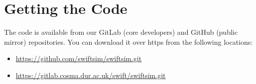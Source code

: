 \section{Getting the Code}

The code is available from our GitLab (core developers) and GitHub (public mirror)
repositories. You can download it over https from the following locations:

\begin{itemize}
\item \url{https://github.com/swiftsim/swiftsim.git}
\item \url{https://gitlab.cosma.dur.ac.uk/swift/swiftsim.git}
\end{itemize}


